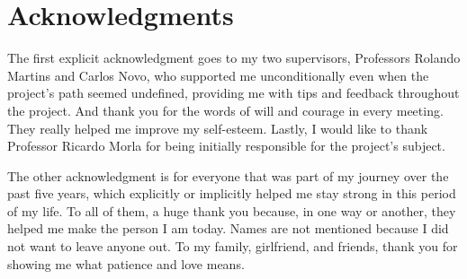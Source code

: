 \chapter*{Acknowledgments}

The first explicit acknowledgment goes to my two supervisors, Professors Rolando Martins and Carlos Novo, who supported me unconditionally even when the project's path seemed undefined, providing me with tips and feedback throughout the project. And thank you for the words of will and courage in every meeting. They really helped me improve my self-esteem. Lastly, I would like to thank Professor Ricardo Morla for being initially responsible for the project's subject.  


The other acknowledgment is for everyone that was part of my journey over the past five years, which explicitly or implicitly helped me stay strong in this period of my life. To all of them, a huge thank you because, in one way or another, they helped me make the person I am today. Names are not mentioned because I did not want to leave anyone out. To my family, girlfriend, and friends, thank you for showing me what patience and love means.

\vspace{10mm}
